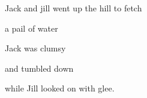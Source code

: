 Jack and jill went
up the hill to fetch

a pail of water

Jack was clumsy 

and tumbled down

while Jill looked on with glee.
